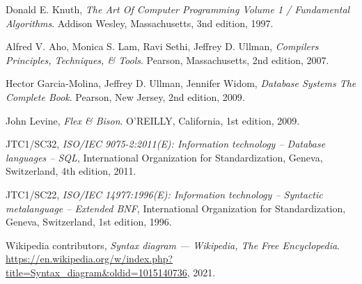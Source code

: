 
\begin{thebibliography}{50}

	Donald E. Knuth,
	\emph{The Art Of Computer Programming \small{Volume 1 / Fundamental Algorithms}}.
	Addison Wesley, Massachusetts,
	3nd edition,
	1997.
	
	Alfred V. Aho, Monica S. Lam, Ravi Sethi, Jeffrey D. Ullman,
	\emph{Compilers \small{Principles, Techniques, \& Tools}}.
	Pearson, Massachusetts,
	2nd edition,
	2007.

	Hector Garcia-Molina, Jeffrey D. Ullman, Jennifer Widom,
	\emph{Database Systems \small{The Complete Book}}.
	Pearson, New Jersey,
	2nd edition,
	2009.

	John Levine,
	\emph{Flex \& Bison}.
	O'REILLY, California,
	1st edition,
	2009.

	JTC1/SC32,
	\emph{ISO/IEC 9075-2:2011(E): Information technology -- Database languages -- SQL},
	International Organization for Standardization, Geneva, Switzerland,
	4th edition,
	2011.

	JTC1/SC22,
	\emph{ISO/IEC 14977:1996(E): Information technology -- Syntactic metalanguage -- Extended BNF},
	International Organization for Standardization, Geneva, Switzerland,
	1st edition,
	1996.
	
	Wikipedia contributors,
	\emph{Syntax diagram --- Wikipedia{,} The Free Encyclopedia}.
	\url{https://en.wikipedia.org/w/index.php?title=Syntax_diagram&oldid=1015140736},
	2021.

	
	
\end{thebibliography}

